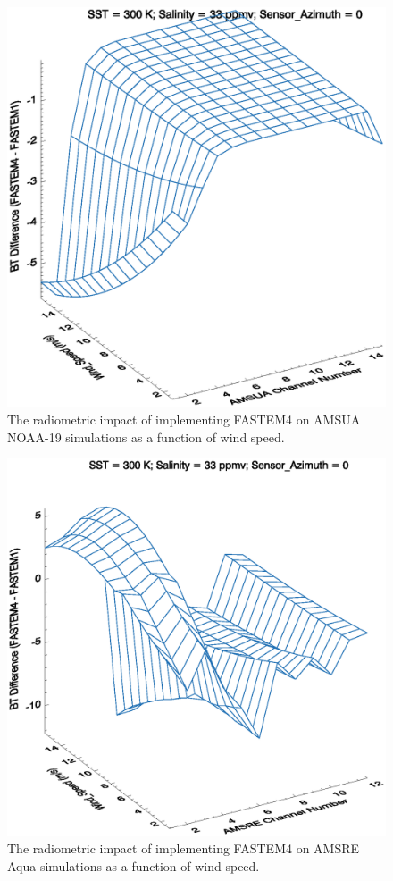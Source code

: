 \begin{figure}[htp]
  \centering
  \includegraphics{graphics/AMSUA_Wind_Speed_BT.eps}
  \caption{The radiometric impact of implementing FASTEM4 on AMSUA NOAA-19 simulations as a function of wind speed.}
  \label{fig:AMSUA_Wind_Speed_Impact}
\end{figure}

\begin{figure}[htp]
  \centering
  \includegraphics{graphics/AMSRE_Wind_Speed_BT.eps}
  \caption{The radiometric impact of implementing FASTEM4 on AMSRE Aqua simulations as a function of wind speed.}
  \label{fig:AMSRE_Wind_Speed_Impact}
\end{figure}

